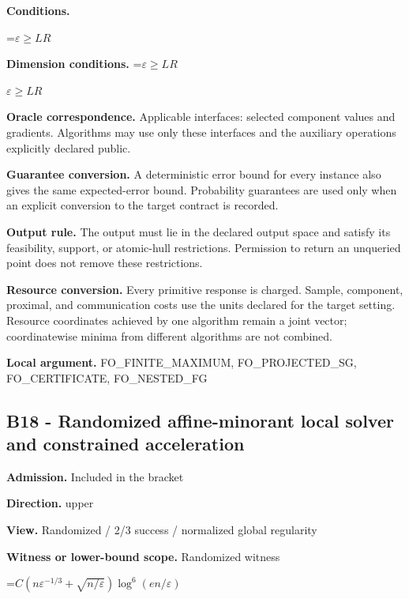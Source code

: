 \documentclass[10pt,a4paper]{article}
\newcommand{\AtlasMath}[1]{\par\begingroup\centering\setbox0=\hbox{$\displaystyle #1$}\ifdim\wd0>1.4\linewidth\typeout{ATLAS WIDE FORMULA: \the\wd0}\fi\ifdim\wd0>\linewidth\resizebox{\linewidth}{!}{\box0}\else\box0\fi\par\endgroup}
\newcommand{\AtlasInlineMath}[1]{\begingroup\setbox0=\hbox{$#1$}\ifdim\wd0>.4\linewidth\endgroup\AtlasMath{#1}\else\endgroup$#1$\fi}
\begin{document}
\textbf{Conditions.}
\AtlasMath{\varepsilon\ge LR}




\textbf{Dimension conditions.} \AtlasInlineMath{\varepsilon\ge LR}



\textbf{Oracle correspondence.} Applicable interfaces: selected component values and gradients. Algorithms may use only these interfaces and the auxiliary operations explicitly declared public.



\textbf{Guarantee conversion.} A deterministic error bound for every instance also gives the same expected-error bound. Probability guarantees are used only when an explicit conversion to the target contract is recorded.



\textbf{Output rule.} The output must lie in the declared output space and satisfy its feasibility, support, or atomic-hull restrictions. Permission to return an unqueried point does not remove these restrictions.



\textbf{Resource conversion.} Every primitive response is charged. Sample, component, proximal, and communication costs use the units declared for the target setting. Resource coordinates achieved by one algorithm remain a joint vector; coordinatewise minima from different algorithms are not combined.



\textbf{Local argument.} FO\_FINITE\_MAXIMUM, FO\_PROJECTED\_SG, FO\_CERTIFICATE, FO\_NESTED\_FG



\subsection{B18 - Randomized affine-minorant local solver and constrained acceleration}


\textbf{Admission.} Included in the bracket



\textbf{Direction.} upper



\textbf{View.} Randomized / 2/3 success / normalized global regularity



\textbf{Witness or lower-bound scope.} Randomized witness



\AtlasMath{C(n\varepsilon^{-1/3}+\sqrt{n/\varepsilon})\log^6(en/\varepsilon)}
\end{document}
